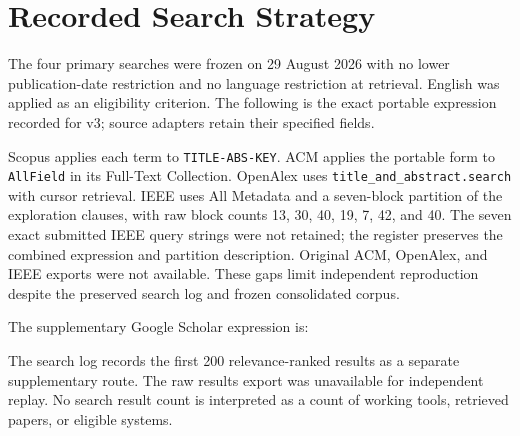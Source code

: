 \documentclass[manuscript,review,screen]{acmart}
\begin{document}
\section{Recorded Search Strategy}\label{app:search}
The four primary searches were frozen on 29 August 2026 with no lower publication-date restriction and no language restriction at retrieval. English was applied as an eligibility criterion. The following is the exact portable expression recorded for v3; source adapters retain their specified fields.



\begin{quote}\footnotesize\ttfamily\raggedright\sloppy
{}
\end{quote}
Scopus applies each term to \texttt{TITLE-ABS-KEY}. ACM applies the portable form to \texttt{AllField} in its Full-Text Collection. OpenAlex uses \texttt{title\_and\_abstract.search} with cursor retrieval. IEEE uses All Metadata and a seven-block partition of the exploration clauses, with raw block counts 13, 30, 40, 19, 7, 42, and 40. The seven exact submitted IEEE query strings were not retained; the register preserves the combined expression and partition description. Original ACM, OpenAlex, and IEEE exports were not available. These gaps limit independent reproduction despite the preserved search log and frozen consolidated corpus.

The supplementary Google Scholar expression is:
\begin{quote}\footnotesize\ttfamily\raggedright\sloppy
{}
\end{quote}
The search log records the first 200 relevance-ranked results as a separate supplementary route. The raw results export was unavailable for independent replay. No search result count is interpreted as a count of working tools, retrieved papers, or eligible systems.
\end{document}
